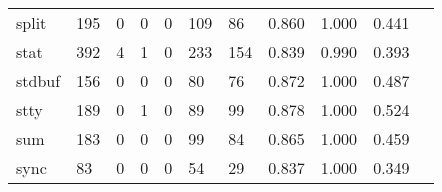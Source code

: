 \begin{longtable}{lp{1.2cm}p{1.2cm}p{1.2cm}p{1.2cm}p{1.2cm}p{1.2cm}p{1.2cm}p{1.2cm}p{1.2cm}p{1.2cm}}
split     &                                   195 &                                                  0 &                                                  0 &                                                  0 &                                                109 &                                                 86 &                                              0.860 &                                              1.000 &                                              0.441 \\
stat      &                                   392 &                                                  4 &                                                  1 &                                                  0 &                                                233 &                                                154 &                                              0.839 &                                              0.990 &                                              0.393 \\
stdbuf    &                                   156 &                                                  0 &                                                  0 &                                                  0 &                                                 80 &                                                 76 &                                              0.872 &                                              1.000 &                                              0.487 \\
stty      &                                   189 &                                                  0 &                                                  1 &                                                  0 &                                                 89 &                                                 99 &                                              0.878 &                                              1.000 &                                              0.524 \\
sum       &                                   183 &                                                  0 &                                                  0 &                                                  0 &                                                 99 &                                                 84 &                                              0.865 &                                              1.000 &                                              0.459 \\
sync      &                                    83 &                                                  0 &                                                  0 &                                                  0 &                                                 54 &                                                 29 &                                              0.837 &                                              1.000 &                                              0.349 \\

\end{longtable}
